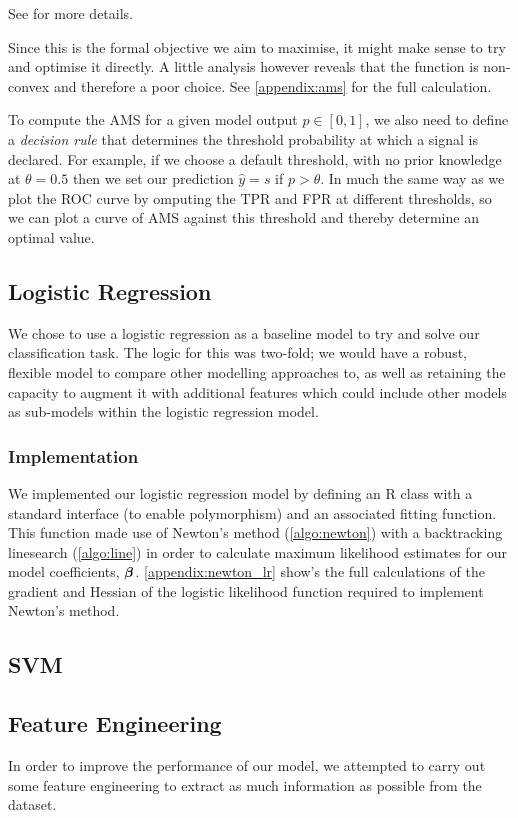 See \cite{HiggsML} for more details.

Since this is the formal objective we aim to maximise, it might make sense to try and optimise it directly. A little analysis however reveals that the function is non-convex and therefore a poor choice. See \ref{appendix:ams} for the full calculation.

To compute the AMS for a given model output $p \in [0,1]$, we also need to define a \emph{decision rule} that determines the threshold probability at which a signal is declared. For example, if we choose a default threshold, with no prior knowledge at $\theta = 0.5$ then we set our prediction $\hat{y} = s$ if $p > \theta$. In much the same way as we plot the ROC curve by omputing the TPR and FPR at different thresholds, so we can plot a curve of AMS against this threshold and thereby determine an optimal value. 

\subsection{Logistic Regression}
We chose to use a logistic regression as a baseline model to try and solve our classification task. The logic for this was two-fold; we would have a robust, flexible model to compare other modelling approaches to, as well as retaining the capacity to augment it with additional features which could include other models as sub-models within the logistic regression model. 

\subsubsection{Implementation}
We implemented our logistic regression model by defining an R class with a standard interface (to enable polymorphism) and an associated fitting function. This function made use of Newton's method (\ref{algo:newton}) with a backtracking linesearch (\ref{algo:line}) in order to calculate maximum likelihood estimates for our model coefficients, $\bm{\beta}$. \ref{appendix:newton_lr} show's the full calculations of the gradient and Hessian of the logistic likelihood function required to implement Newton's method.

\subsection{SVM}

\subsection{Feature Engineering}
In order to improve the performance of our model, we attempted to carry out some feature engineering to extract as much information as possible from the dataset.

